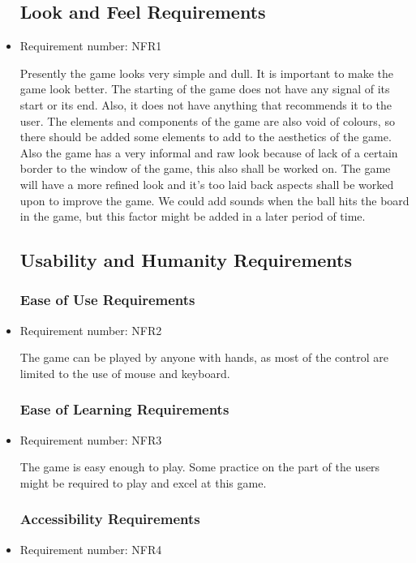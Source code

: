 \documentclass[12pt,letterpaper]{article}
\begin{document}
\begin{itemize}
	\subsection{Look and Feel Requirements}
	
	\item Requirement number: NFR1
	
	Presently the game looks very simple and dull. It is important to make the game look better. The starting of the game does not have any signal of its start or its end. Also, it does not have anything that recommends it to the user. The elements and components of the game are also void of colours, so there should be added some elements to add to the aesthetics of the game. Also the game has a very informal and raw look because of lack of a certain border to the window of the game, this also shall be worked on. The game will have a more refined look and it’s too laid back aspects shall be worked upon to improve the game. We could add sounds when the ball hits the board in the game, but this factor might be added in a later period of time.
	\subsection{Usability and Humanity Requirements}
	\subsubsection{Ease of Use Requirements}
	
	\item Requirement number: NFR2
	
   	The game can be played by anyone with hands, as most of the control are limited to the use of mouse and keyboard.
 	\subsubsection{Ease of Learning Requirements}
 	
 	\item Requirement number: NFR3
 	
   	The game is easy enough to play. Some practice on the part of the users might be required to play and excel at this game.
 	\subsubsection{Accessibility Requirements}
 	
 	\item Requirement number: NFR4
 	

\end{itemize}
\end{document}

